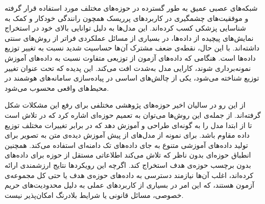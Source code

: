 

شبکه‌های عصبی عمیق \cite{dnn1, dnn2, dnn3} 
به طور گسترده در حوزه‌های مختلف مورد استفاده قرار گرفته و موفقیت‌های چشمگیری در کاربردهای پرریسک همچون رانندگی خودکار \cite{autonomous1, autonomous2} 
و کمک به شناسایی پزشکی \cite{diagnosis1, diagnosis2} کسب کرده‌اند. این مدل‌ها به دلیل توانایی بالای خود در استخراج نمایش‌های پیچیده از داده‌ها، در بسیاری از مسائل عملکردی فراتر از روش‌های سنتی داشته‌اند. با این حال، نقطه‌ی ضعف مشترک آن‌ها حساسیت شدید نسبت به تغییر توزیع داده‌ها است. هنگامی که داده‌های آزمون از توزیعی متفاوت نسبت به داده‌های آموزش نمونه‌برداری شوند، کارایی مدل به‌شدت افت می‌کند. این پدیده که تحت عنوان {تغییر توزیع} شناخته می‌شود، یکی از چالش‌های اساسی در پیاده‌سازی سامانه‌های هوشمند در محیط‌های واقعی محسوب می‌شود.

از این رو در سالیان اخیر حوزه‌های پژوهشی مختلفی برای رفع این مشکلات شکل گرفته‌اند. از جمله‌ی این روش‌ها می‌توان به {‌‌تعمیم حوزه‌ای} اشاره کرد که در تلاش است تا از ابتدا مدل را به گونه‌ای طراحی و آموزش دهد که در برابر تغییرات مختلف توزیع داده مقاوم باشد. برای نمونه \cite{adverprompttuning} از مدل‌های از پیش آموزش‌ دیده‌ی متن به تصویر برای تولید داده‌های آموزشی متنوع به جای داده‌های {تک دامنه‌ای } استفاده می‌کند. همچنین {انطباق حوزه‌ای بدون ناظر} که تلاش می‌کند اطلاعاتی مستقل از حوزه برای داده‌های بدون برچسب حوزه‌ی هدف استخراج کند. اگرچه این رویکردها نتایج ارزشمندی ارائه کرده‌اند، اغلب آن‌ها نیازمند دسترسی به داده‌های حوزه‌ی هدف یا حتی کل مجموعه‌ی آزمون هستند، که این امر در بسیاری از کاربردهای عملی به دلیل محدودیت‌های حریم خصوصی، مسائل قانونی یا شرایط بلادرنگ امکان‌پذیر نیست.

